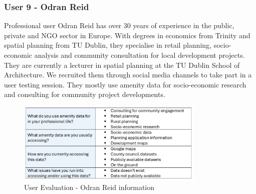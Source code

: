 \newpage
\subsubsection{User 9 - Odran Reid}
Professional user Odran Reid has over 30 years of experience in the public,
private and NGO sector in Europe. With degrees in economics from Trinity and
spatial planning from TU Dublin, they specialise in retail planning,
socio-economic analysis and community consultation for local development
projects. They are currently a lecturer in spatial planning at the TU Dublin
School of Architecture. We recruited them through social media channels to take
part in a user testing session. They mostly use amenity data for socio-economic
research and consulting for community project developments.
\begin{figure}[h!]
    \centering
    \includegraphics[width=0.8\textwidth]{images/odran-amenity-info.png}
    \caption{User Evaluation - Odran Reid information}
\end{figure}

\newpage{}

